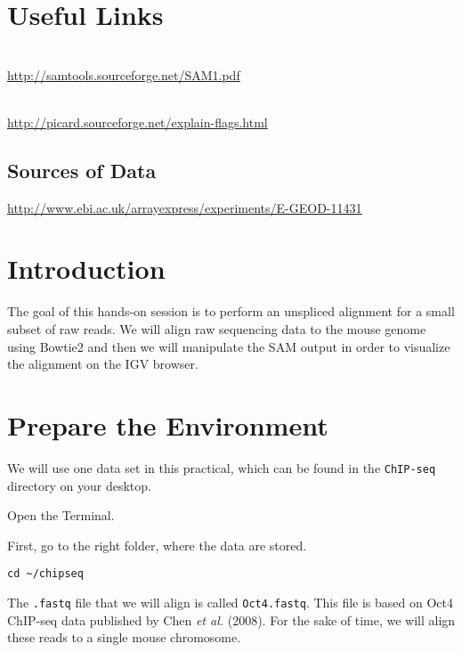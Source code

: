 \section{Useful Links}
 
\begin{description}[style=multiline,labelindent=0cm,align=left,leftmargin=0.5cm]
  \item[SAM Specification]\hfill\\
    \url{http://samtools.sourceforge.net/SAM1.pdf}
  \item[Explain SAM Flags]\hfill\\
    \url{http://picard.sourceforge.net/explain-flags.html}
\end{description}

\subsection{Sources of Data}
  \url{http://www.ebi.ac.uk/arrayexpress/experiments/E-GEOD-11431}

\clearpage

\section{Introduction}

\begin{information}
The goal of this hands-on session is to perform an unspliced alignment for a
small subset of raw reads. We will align raw sequencing data to the mouse genome
using Bowtie2 and then we will manipulate the SAM output in order to
visualize the alignment on the IGV browser.
\end{information}

\section{Prepare the Environment}

\begin{information}
We will use one data set in this practical, which can be found in the \texttt{ChIP-seq}
directory on your desktop.
\end{information}

\begin{steps}
Open the Terminal.

First, go to the right folder, where the data are stored.
\begin{lstlisting}
cd ~/chipseq
\end{lstlisting}

\begin{information}
The \texttt{.fastq} file that we will align is called \texttt{Oct4.fastq}. This
file is based on Oct4 ChIP-seq data published by Chen \textit{et al.} (2008). For the
sake of time, we will align these reads to a single mouse chromosome.
\end{information}
\end{steps}

